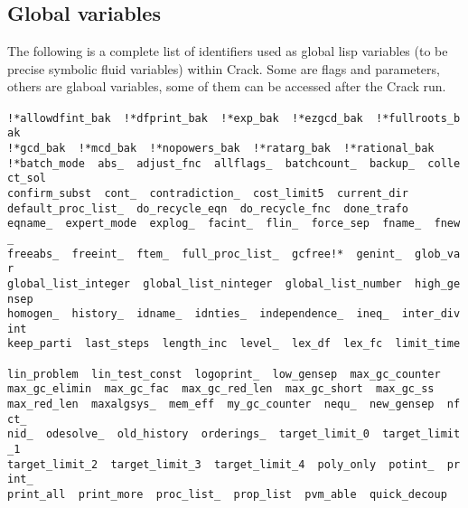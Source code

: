 \documentclass[12pt]{article}
\begin{document}
\subsection{Global variables}
The following is a complete list of identifiers used as global
lisp variables (to be precise symbolic fluid variables) 
within {\sc Crack}. Some are flags and parameters, others are glaboal
variables, some of them can be accessed after the {\sc Crack}
run. \vspace{6pt} \\
\noindent
{\tt 
!*allowdfint\_bak\ \ !*dfprint\_bak\ \ !*exp\_bak\ \ !*ezgcd\_bak\ \ !*fullroots\_bak\ \ \\
!*gcd\_bak\ \ !*mcd\_bak\ \ !*nopowers\_bak\ \ !*ratarg\_bak\ \ !*rational\_bak\ \ \\
!*batch\_mode\ \ abs\_\ \ adjust\_fnc\ \ allflags\_\ \ batchcount\_\ \ backup\_\ \ collect\_sol\\ 
confirm\_subst\ \ cont\_\ \ contradiction\_\ \ cost\_limit5\ \ current\_dir\ \ \\
default\_proc\_list\_\ \ do\_recycle\_eqn\ \ do\_recycle\_fnc\ \ done\_trafo\ \ \\
eqname\_\ \ expert\_mode\ \ explog\_\ \ facint\_\ \ flin\_\ \ force\_sep\ \ fname\_\ \ fnew\_\ \ \\
freeabs\_\ \ freeint\_\ \ ftem\_\ \ full\_proc\_list\_\ \ gcfree!*\ \ genint\_\ \ glob\_var\ \ \\
global\_list\_integer\ \ global\_list\_ninteger\ \ global\_list\_number\ \ high\_gensep\ \ \\
homogen\_\ \ history\_\ \ idname\_\ \ idnties\_\ \ independence\_\ \ ineq\_\ \ inter\_divint\ \ \\
keep\_parti\ \ last\_steps\ \ length\_inc\ \ level\_\ \ lex\_df\ \ lex\_fc\ \ limit\_time\ \ \\
lin\_problem\ \ lin\_test\_const\ \ logoprint\_\ \ low\_gensep\ \ max\_gc\_counter\ \ \\
max\_gc\_elimin\ \ max\_gc\_fac\ \ max\_gc\_red\_len\ \ max\_gc\_short\ \ max\_gc\_ss\ \ \\
max\_red\_len\ \ maxalgsys\_\ \ mem\_eff\ \ my\_gc\_counter\ \ nequ\_\ \ new\_gensep\ \ nfct\_\ \ \\
nid\_\ \ odesolve\_\ \ old\_history\ \ orderings\_\ \ target\_limit\_0\ \ target\_limit\_1\ \ \\
target\_limit\_2\ \ target\_limit\_3\ \ target\_limit\_4\ \ poly\_only\ \ potint\_\ \ print\_\ \ \\
print\_all\ \ print\_more\ \ proc\_list\_\ \ prop\_list\ \ pvm\_able\ \ quick\_decoup\ \ \\
}
\end{document}
